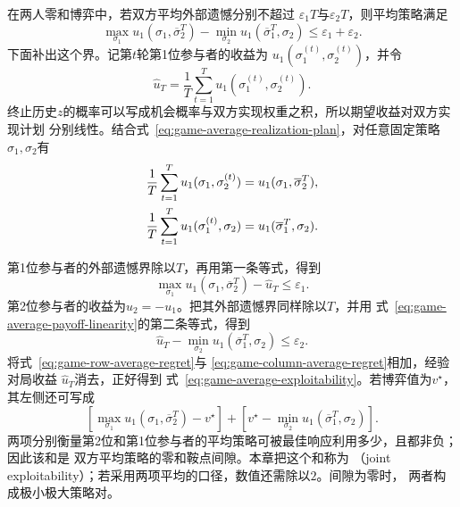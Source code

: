 在两人零和博弈中，若双方平均外部遗憾分别不超过
\(\varepsilon_1T\)与\(\varepsilon_2T\)，则平均策略满足
\begin{equation}
  \max_{\sigma_1}
  u_1(\sigma_1,\overline{\sigma}_2^T)
  -
  \min_{\sigma_2}
  u_1(\overline{\sigma}_1^T,\sigma_2)
  \leq
  \varepsilon_1+\varepsilon_2.
  \label{eq:game-average-exploitability}
\end{equation}
下面补出这个界。记第\(t\)轮第1位参与者的收益为
\(u_1(\sigma_1^{(t)},\sigma_2^{(t)})\)，并令
\[
  \widehat u_T
  =
  \frac{1}{T}
  \sum_{t=1}^{T}
  u_1(\sigma_1^{(t)},\sigma_2^{(t)}).
\]
终止历史\(z\)的概率可以写成机会概率与双方实现权重之积，所以期望收益对双方实现计划
分别线性。结合式~\eqref{eq:game-average-realization-plan}，对任意固定策略
\(\sigma_1,\sigma_2\)有
\begin{align}
  \frac{1}{T}\sum_{t=1}^{T}
  u_1(\sigma_1,\sigma_2^{(t)})
  &=
  u_1(\sigma_1,\overline{\sigma}_2^T),
  \notag\\
  \frac{1}{T}\sum_{t=1}^{T}
  u_1(\sigma_1^{(t)},\sigma_2)
  &=
  u_1(\overline{\sigma}_1^T,\sigma_2).
  \label{eq:game-average-payoff-linearity}
\end{align}

第1位参与者的外部遗憾界除以\(T\)，再用第一条等式，得到
\begin{equation}
  \max_{\sigma_1}
  u_1(\sigma_1,\overline{\sigma}_2^T)
  -
  \widehat u_T
  \leq
  \varepsilon_1.
  \label{eq:game-row-average-regret}
\end{equation}
第2位参与者的收益为\(u_2=-u_1\)。把其外部遗憾界同样除以\(T\)，并用
式~\eqref{eq:game-average-payoff-linearity}的第二条等式，得到
\begin{equation}
  \widehat u_T
  -
  \min_{\sigma_2}
  u_1(\overline{\sigma}_1^T,\sigma_2)
  \leq
  \varepsilon_2.
  \label{eq:game-column-average-regret}
\end{equation}
将式~\eqref{eq:game-row-average-regret}与
\eqref{eq:game-column-average-regret}相加，经验对局收益
\(\widehat u_T\)消去，正好得到
式~\eqref{eq:game-average-exploitability}。若博弈值为\(v^\star\)，其左侧还可写成
\[
  \left[
    \max_{\sigma_1}u_1(\sigma_1,\overline{\sigma}_2^T)-v^\star
  \right]
  +
  \left[
    v^\star-\min_{\sigma_2}u_1(\overline{\sigma}_1^T,\sigma_2)
  \right].
\]
两项分别衡量第2位和第1位参与者的平均策略可被最佳响应利用多少，且都非负；因此该和是
双方平均策略的零和鞍点间隙。本章把这个和称为
（joint exploitability）；若采用两项平均的口径，数值还需除以\(2\)。间隙为零时，
两者构成极小极大策略对。

